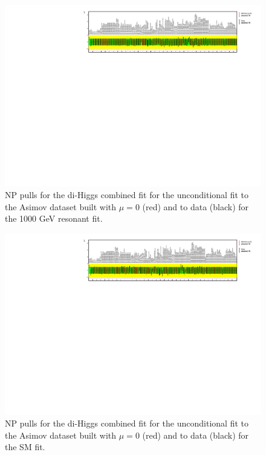 \begin{figure}
\centering
\includegraphics[angle=270]{figures/results/HH/Combined/NP_allExceptGammas_2HDM1000.pdf}
\caption{NP pulls for the di-Higgs combined fit for the unconditional fit to the Asimov dataset built with $\mu=0$ (red) and to data (black) for the 1000 GeV resonant fit.}
\label{fig:CombinedPostfitNPPulls2HDM1000}
\end{figure}

\begin{figure}
\centering
\includegraphics[angle=270]{figures/results/HH/Combined/NP_allExceptGammas_SM.pdf}
\caption{NP pulls for the di-Higgs combined fit for the unconditional  fit to the Asimov dataset built with $\mu=0$ (red) and to data (black) for the SM fit.}
\label{fig:CombinedPostfitNPPullsSM}
\end{figure}

